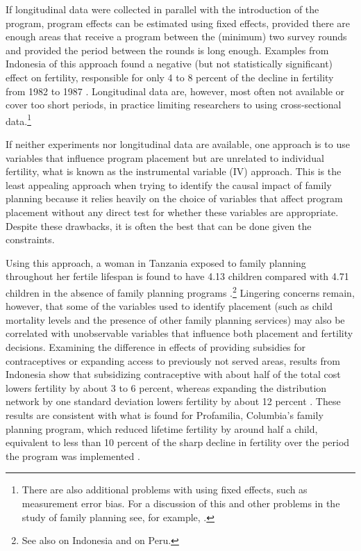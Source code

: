 If longitudinal data were collected in parallel with the introduction of the program, program effects can be estimated using fixed effects, provided there are enough areas that receive a program between the (minimum) two survey rounds and provided the period between the rounds is long enough. Examples from Indonesia of this approach found a negative (but not statistically significant) effect on fertility, responsible for only 4 to 8 percent of the decline in fertility from 1982 to 1987 \citep{pitt93,Gertler1994}. Longitudinal data are, however, most often not available or cover too short periods, in practice limiting researchers to using cross-sectional data.\footnote{There are also additional problems with using fixed effects, such as measurement error bias. For a discussion of this and other problems in the study of family planning see, for example, \cite{angeles98}.}

If neither experiments nor longitudinal data are available, one approach is to use variables that influence program placement but are unrelated to individual fertility, what is known as the instrumental variable (IV) approach. This is the least appealing approach when trying to identify the causal impact of family planning because it relies heavily on the choice of variables that affect program placement without any direct test for whether these variables are appropriate. Despite these drawbacks, it is often the best that can be done given the constraints.

Using this approach, a woman in Tanzania exposed to family planning throughout her fertile lifespan is found to have 4.13 children compared with 4.71 children in the absence of family planning programs \citep{angeles98}.\footnote{See also \citet{Angeles2005} on Indonesia and \citep{Angeles2005a} on Peru.} Lingering concerns remain, however, that some of the variables used to identify placement (such as child mortality levels and the presence of other family planning services) may also be correlated with unobservable variables that influence both placement and fertility decisions. Examining the difference in effects of providing subsidies for contraceptives or expanding access to previously not served areas, results from Indonesia show that subsidizing contraceptive with about half of the total cost lowers fertility by about 3 to 6 percent, whereas expanding the distribution network by one standard deviation lowers fertility by about 12 percent \citep{Molyneaux2000}. These results are consistent with what is found for Profamilia, Columbia's family planning program, which reduced lifetime fertility by around half a child, equivalent to less than 10 percent of the sharp decline in fertility over the period the program was implemented \citep{Miller2010}.

